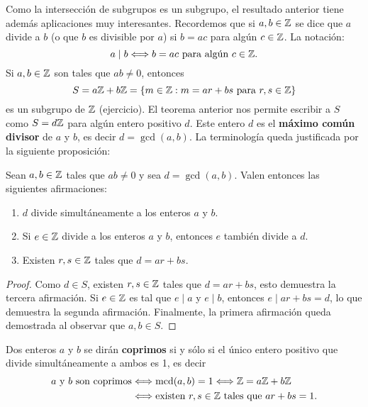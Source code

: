 Como la intersección de subgrupos es un subgrupo, 
el resultado anterior tiene además aplicaciones muy interesantes. Recordemos que si $a,b\in\mathbb{Z}$ 
se dice que $a$ divide a $b$ (o que $b$ es divisible por $a$) 
si $b=ac$ para algún $c\in\mathbb{Z}$. La notación: 
\[
a\mid b\Longleftrightarrow b=ac\text{ para algún $c\in\mathbb{Z}$.}
\]
Si $a,b\in\mathbb{Z}$ son tales que $ab\ne0$, entonces 
\[
S=a\mathbb{Z}+b\mathbb{Z}=\{m\in\mathbb{Z}:m=ar+bs\text{ para $r,s\in\mathbb{Z}$}\}
\]
es un subgrupo de $\mathbb{Z}$ (ejercicio). El teorema anterior nos permite escribir a $S$ como $S=d\mathbb{Z}$ para algún entero positivo $d$. Este entero $d$ 
es el \textbf{máximo común divisor} de $a$ y $b$, es decir $d=\gcd(a,b)$. La terminología queda justificada por la siguiente proposición:

\begin{proposition}
Sean $a,b\in\mathbb{Z}$ tales que $ab\ne0$ y sea $d=\gcd(a,b)$. Valen entonces las siguientes afirmaciones:
\begin{enumerate}
\item $d$ divide simultáneamente a los enteros $a$ y $b$. 
\item Si $e\in\mathbb{Z}$ divide a los enteros $a$ y $b$, entonces $e$ también divide a $d$.
\item Existen $r,s\in\mathbb{Z}$ tales que $d=ar+bs$. 
\end{enumerate}
\end{proposition}

\begin{proof}
    Como $d\in S$, existen $r,s\in\mathbb{Z}$ tales que $d=ar+bs$, esto demuestra la tercera afirmación. Si $e\in\mathbb{Z}$ es tal que $e\mid a$ y $e\mid b$, 
    entonces $e\mid ar+bs=d$, lo que demuestra la segunda afirmación. Finalmente, la primera afirmación queda demostrada al observar que
    $a,b\in S$. 
\end{proof}

Dos enteros $a$ y $b$ se dirán \textbf{coprimos} si y sólo si 
el único entero positivo que divide simultáneamente a ambos es 1, es decir 
\begin{align*}
a\text{ y }b\text{ son coprimos}&\Longleftrightarrow \operatorname{mcd}(a,b)=1\Longleftrightarrow \mathbb{Z}=a\mathbb{Z}+b\mathbb{Z}\\
&\Longleftrightarrow \text{existen $r,s\in\mathbb{Z}$ tales que $ar+bs=1$.}
\end{align*}



